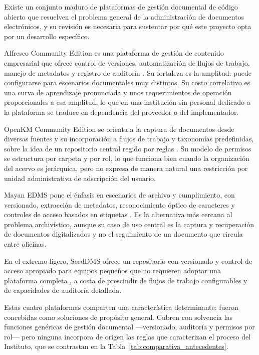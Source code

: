 Existe un conjunto maduro de plataformas de gestión documental de código abierto que resuelven el problema general de la administración de documentos electrónicos, y su revisión es necesaria para sustentar por qué este proyecto opta por un desarrollo específico.

Alfresco Community Edition es una plataforma de gestión de contenido empresarial que ofrece control de versiones, automatización de flujos de trabajo, manejo de metadatos y registro de auditoría \cite{alfresco}. Su fortaleza es la amplitud: puede configurarse para escenarios documentales muy distintos. Su costo correlativo es una curva de aprendizaje pronunciada y unos requerimientos de operación proporcionales a esa amplitud, lo que en una institución sin personal dedicado a la plataforma se traduce en dependencia del proveedor o del implementador.

OpenKM Community Edition se orienta a la captura de documentos desde diversas fuentes y su incorporación a flujos de trabajo y taxonomías predefinidas, sobre la idea de un repositorio central regido por reglas \cite{openkm}. Su modelo de permisos se estructura por carpeta y por rol, lo que funciona bien cuando la organización del acervo es jerárquica, pero no expresa de manera natural una restricción por unidad administrativa de adscripción del usuario.

Mayan EDMS pone el énfasis en escenarios de archivo y cumplimiento, con versionado, extracción de metadatos, reconocimiento óptico de caracteres y controles de acceso basados en etiquetas \cite{mayanedms}. Es la alternativa más cercana al problema archivístico, aunque su caso de uso central es la captura y recuperación de documentos digitalizados y no el seguimiento de un documento que circula entre oficinas.

En el extremo ligero, SeedDMS ofrece un repositorio con versionado y control de acceso apropiado para equipos pequeños que no requieren adoptar una plataforma completa \cite{seeddms}, a costa de prescindir de flujos de trabajo configurables y de capacidades de auditoría detallada.

Estas cuatro plataformas comparten una característica determinante: fueron concebidas como soluciones de propósito general. Cubren con solvencia las funciones genéricas de gestión documental —versionado, auditoría y permisos por rol— pero ninguna incorpora de origen las reglas que caracterizan el proceso del Instituto, que se contrastan en la Tabla~\ref{tab:comparativa_antecedentes}.


